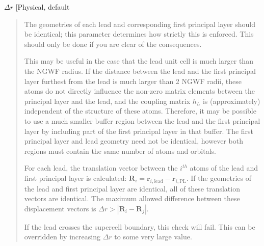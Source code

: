 \documentclass[letterpaper,10pt,english]{sphinxmanual}
\begin{document}
 \(\Delta r\) {[}Physical, default \sphinxcode{etrans\_lead\_disp\_tol : 1.0 bohr}{]}
\begin{quote}

\begin{DUlineblock}{0em}
\item[] The geometries of each lead and corresponding first principal layer
should be identical; this parameter determines how strictly this is
enforced. This should only be done if you are clear of the consequences.
\item[] This may be useful in the case that the lead unit cell is much larger
than the NGWF radius. If the distance between the lead and the first
principal layer furthest from the lead is much larger than 2 NGWF radii,
these atoms do not directly influence the non-zero matrix elements
between the principal layer and the lead, and the coupling matrix
\(h_L\) is (approximately) independent of the structure of these
atoms. Therefore, it may be possible to use a much smaller buffer region
between the lead and the first principal layer by including part of the
first principal layer in that buffer. The first principal layer and lead
geometry need not be identical, however both regions must contain the
same number of atoms and orbitals.
\end{DUlineblock}

\begin{DUlineblock}{0em}
\item[] For each lead, the translation vector between the \(i^{th}\) atoms
of the lead and first principal layer is calculated:
\(\mathbf{R}_{i} = \mathbf{r}_{i\mathrm{,lead}} - \mathbf{r}_{i\mathrm{,PL}}\).
If the geometries of the lead and first principal layer are identical,
all of these translation vectors are identical. The maximum allowed
difference between these displacement vectors is
\(\Delta r > |\mathbf{R}_{i} - \mathbf{R}_{j}|\).
\item[] If the lead crosses the supercell boundary, this check will fail. This
can be overridden by increasing \(\Delta r\) to some very large
value.
\end{DUlineblock}
\end{quote}
\end{document}
